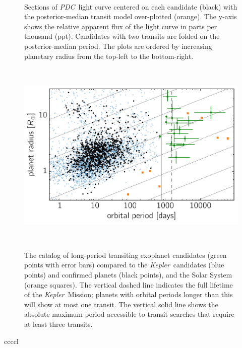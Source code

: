 \documentclass[manuscript, letterpaper]{aastex6}
\newcommand{\project}[1]{\textsl{#1}}
\newcommand{\kepler}{\project{Kepler}}
\newcommand{\pdc}{\project{PDC}}
\newcommand{\dfmfiglabel}[1]{\label{fig:#1}}
\begin{document}
\begin{figure}[p]~\\
\begin{center}

\end{center}
\caption{%
Sections of \pdc\ light curve centered on each candidate (black) with the
posterior-median transit model over-plotted (orange).
The y-axis shows the relative apparent flux of the light curve in parts per
thousand (ppt).
Candidates with two transits are folded on the posterior-median period.
The plots are ordered by increasing planetary radius from the top-left to the
bottom-right.
\dfmfiglabel{light-curves}}
\end{figure}

\begin{figure}~\\
\begin{center}
\includegraphics{figures/full_sample_plus_cands.pdf}
\end{center}
\caption{%
The catalog of long-period transiting exoplanet candidates (green points with
error bars) compared to the \kepler\ candidates (blue points) and confirmed
planets (black points), and the Solar System (orange squares).
The vertical dashed line indicates the full lifetime of the \kepler\ Mission;
planets with orbital periods longer than this will show at most one transit.
The vertical solid line shows the absolute maximum period accessible to
transit searches that require at least three transits.
\dfmfiglabel{full-sample}}~\\
\end{figure}

\begin{floattable}
\begin{deluxetable}{ccccl}
\tabletypesize{\footnotesize}
\caption{The signals rejected with a centroid shift or large impact parameter
\label{tab:rejects}}

\end{deluxetable}
\end{floattable}
\end{document}
